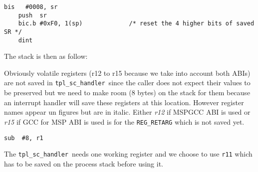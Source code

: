 \documentclass[11pt, oneside]{article}   	%
\newcommand{\sch}{\lstinline{tpl_sc_handler}}
\begin{document}
\begin{lstlisting}[backgroundcolor=\color{yellow!15}]
    bis   #0008, sr
    push  sr
    bic.b #0xF0, 1(sp)             /* reset the 4 higher bits of saved SR */
    dint
\end{lstlisting}

The stack is then as follow:

\begin{center}
\end{center}

Obviously volatile registers (r12 to r15 because we take into account both ABIs) are not saved in \sch\ since the caller does not expect their values to be preserved but we need to make room (8 bytes) on the stack for them because an interrupt handler will save these registers at this location. However register names appear un figures but are in italic. Either \textit{r12} if MSPGCC ABI is used or \textit{r15} if GCC for MSP ABI is used is for the \lstinline{REG_RETARG} which is not saved yet.

\begin{lstlisting}[backgroundcolor=\color{yellow!15}]
    sub  #8, r1
\end{lstlisting}

The \sch\ needs one working register and we choose to use \lstinline{r11} which has to be saved on the process stack before using it.
\end{document}

